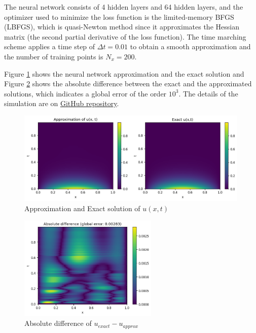\documentclass[a4paper, onecolumn, 12pt]{article}
\begin{document}
The neural network consists of 4 hidden layers and 64 hidden layers, and the optimizer used to
minimize the loss function is the limited-memory BFGS (LBFGS), which is quasi-Newton method since 
it approximates the Hessian matrix (the second partial derivative of the loss function). The time
marching scheme applies a time step of $\Delta t = 0.01$ to obtain a smooth approximation and the number
of training points is $N_x = 200$.

Figure \ref{exact_approximation_diffusion_RK} shows the neural network approximation and the exact solution 
and Figure \ref{abs_diff_disc_pinn_diffusion} shows the absolute difference between the exact and the approximated
solutions, which indicates a global error of the order $10^3$. The details of the simulation are on 
\href{https://github.com/HashimAlSadah/MX-Project/blob/main/PINN/discrete_time_model/Discrete_time_PINN_Diffusion_equation.ipynb}
{GitHub repository}.


\begin{figure}[H]
    \centering
    \includegraphics[width=420px]{images/diffusion_ex_app_dis_PINN.png}
    \vspace{-1em}
    \caption{Approximation and Exact solution of $u(x,t)$}
    \label{exact_approximation_diffusion_RK}
\end{figure}

\begin{figure}[H]
    \centering
    \includegraphics[width=250px]{images/abs_difference_disc_PINN_diffusion.png}
    \vspace{-1em}
    \caption{Absolute difference of $u_{exact} - u_{approx}$}
    \label{abs_diff_disc_pinn_diffusion}
\end{figure}
\end{document}
